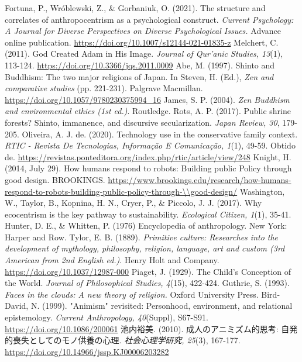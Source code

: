\documentclass[a4j,12pt]{jreport}
\begin{document}
\begin{thebibliography}{999}
 Fortuna, P., Wr\'{o}blewski, Z., \& Gorbaniuk, O. (2021). The structure and correlates of anthropocentrism as a psychological construct. \textsl{Current Psychology: A Journal for Diverse Perspectives on Diverse Psychological Issues.} Advance online publication. \url{https://doi.org/10.1007/s12144-021-01835-z}
 Melchert, C. (2011). God Created Adam in His Image. \textsl{Journal of Qur'anic Studies, 13}(1), 113-124. \url{https://doi.org/10.3366/jqs.2011.0009}
 Abe, M. (1997). Shinto and Buddhism: The two major religions of Japan. In Steven, H. (Ed.), \textsl{Zen and comparative studies} (pp. 221-231). Palgrave Macmillan. \url{https://doi.org/10.1057/9780230375994_16}
 James, S. P. (2004). \textsl{Zen Buddhism and environmental ethics (1st ed.)}. Routledge.
 Rots, A. P. (2017). Public shrine forests? Shinto, immanence, and discursive secularization. \textsl{Japan Review, 30}, 179-205.
 Oliveira, A. J. de. (2020). Technology use in the conservative family context. \textsl{RTIC - Revista De Tecnologias, Informa\c{c}\~{a}o E Comunica\c{c}\~{a}o, 1}(1), 49-59. Obtido de. \url{https://revistas.ponteditora.org/index.php/rtic/article/view/248}
 Knight, H. (2014, July 29). How humans respond to robots: Building public Policy through good design.  BROOKINGS. \url{https://www.brookings.edu/research/how-humans-respond-to-robots-building-public-policy-through-\\good-design/}
 Washington, W., Taylor, B., Kopnina, H. N., Cryer, P., \& Piccolo, J. J. (2017). Why ecocentrism is the key pathway to sustainability. \textsl{Ecological Citizen, 1}(1), 35-41.
 Hunter, D. E., \& Whitten, P. (1976) Encyclopedia of anthropology. New York: Harper and Row.
 Tylor, E. B. (1889). \textsl{Primitive culture: Researches into the development of mythology, philosophy, religion, language, art and custom (3rd American from 2nd English ed.)}. Henry Holt and Company. \url{https://doi.org/10.1037/12987-000}
 Piaget, J. (1929). The Child's Conception of the World. \textsl{Journal of Philosophical Studies, 4}(15), 422-424.
 Guthrie, S. (1993). \textsl{Faces in the clouds: A new theory of religion.} Oxford University Press.
 Bird-David, N. (1999). "Animism" revisited: Personhood, environment, and relational epistemology. \textsl{Current Anthropology, 40}(Suppl), S67-S91. \url{https://doi.org/10.1086/200061}
 池内裕美. (2010). 成人のアニミズム的思考: 自発的喪失としてのモノ供養の心理. \textsl{社会心理学研究, 25}(3), 167-177. \url{https://doi.org/10.14966/jssp.KJ00006203282}

\end{thebibliography}
\end{document}
